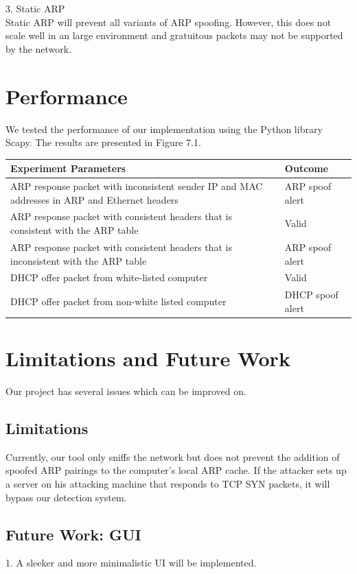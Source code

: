 \documentclass{acm_proc_article-sp}
\begin{document}
3. Static ARP \\ 
Static ARP will prevent all variants of ARP spoofing. However, this does not scale well in an large environment and gratuitous packets may not be supported by the network.

\section{Performance}
We tested the performance of our implementation using the Python library Scapy. The results are presented in Figure 7.1.

\begin{tabular}{ |m{15em}|m{7em}| }
\hline 
Experiment Parameters & Outcome \\
\hline 
 ARP response packet with inconsistent sender IP and MAC addresses in ARP and Ethernet headers & ARP spoof alert \\ 
\hline
 ARP response packet with consistent headers that is consistent with the ARP table &  Valid \\  
\hline
 ARP response packet with consistent headers that is inconsistent with the ARP table & ARP spoof alert \\
\hline
DHCP offer packet from white-listed computer & Valid \\
\hline
DHCP offer packet from non-white listed computer & DHCP spoof alert \\
\hline      
\end{tabular}


\section{Limitations and Future Work}
Our project has several issues which can be improved on.

\subsection{Limitations}
Currently, our tool only sniffs the network but does not prevent the addition of spoofed ARP pairings to the computer’s local ARP cache. If the attacker sets up a server on his attacking machine that responds to TCP SYN packets, it will bypass our detection system.

\subsection{Future Work: GUI}
1. A sleeker and more minimalistic UI will be implemented.
\end{document}
